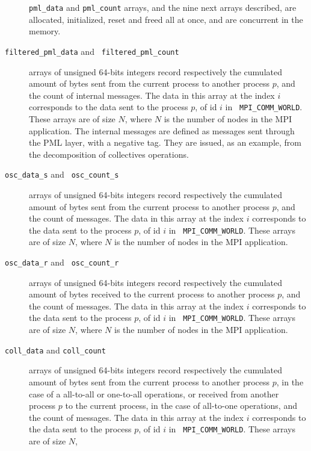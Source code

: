 \documentclass[notitlepage]{article}
\newcommand{\brkunds}[0]{\allowbreak\_}
\begin{document}
\begin{description}
  {\tt pml\brkunds{}data} and {\tt pml\brkunds{}count} arrays, and the
  nine next arrays described, are allocated, initialized, reset and
  freed all at once, and are concurrent in the memory.
\item[{\tt filtered\brkunds{}pml\brkunds{}data} and {\tt
    filtered\brkunds{}pml\brkunds{}count}] arrays of unsigned 64-bits
  integers record respectively the cumulated amount of bytes sent from
  the current process to another process $p$, and the count of
  internal messages. The data in this array at the index $i$
  corresponds to the data sent to the process $p$, of id $i$ in {\tt
    MPI\brkunds{}COMM\brkunds{}WORLD}. These arrays are of size $N$,
  where $N$ is the number of nodes in the MPI application. The
  internal messages are defined as messages sent through the PML
  layer, with a negative tag. They are issued, as an example, from the
  decomposition of collectives operations.
\item[{\tt osc\brkunds{}data\brkunds{}s} and {\tt
    osc\brkunds{}count\brkunds{}s}] arrays of unsigned 64-bits
  integers record respectively the cumulated amount of bytes sent from
  the current process to another process $p$, and the count of
  messages. The data in this array at the index $i$ corresponds to the
  data sent to the process $p$, of id $i$ in {\tt
    MPI\brkunds{}COMM\brkunds{}WORLD}. These arrays are of size $N$,
  where $N$ is the number of nodes in the MPI application.
\item[{\tt osc\brkunds{}data\brkunds{}r} and {\tt
    osc\brkunds{}count\brkunds{}r}] arrays of unsigned 64-bits
  integers record respectively the cumulated amount of bytes received
  to the current process to another process $p$, and the count of
  messages. The data in this array at the index $i$ corresponds to the
  data sent to the process $p$, of id $i$ in {\tt
    MPI\brkunds{}COMM\brkunds{}WORLD}. These arrays are of size $N$,
  where $N$ is the number of nodes in the MPI application.
\item[{\tt coll\brkunds{}data} and {\tt coll\brkunds{}count}] arrays
  of unsigned 64-bits integers record respectively the cumulated
  amount of bytes sent from the current process to another process
  $p$, in the case of a all-to-all or one-to-all operations, or
  received from another process $p$ to the current process, in the
  case of all-to-one operations, and the count of messages. The data
  in this array at the index $i$ corresponds to the data sent to the
  process $p$, of id $i$ in {\tt
    MPI\brkunds{}COMM\brkunds{}WORLD}. These arrays are of size $N$,

\end{description}
\end{document}
